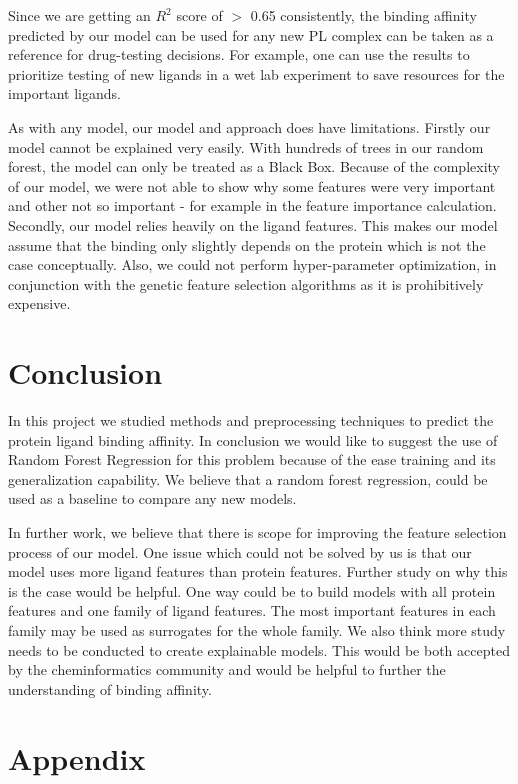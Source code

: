 \documentclass[11pt]{article}
\begin{document}
Since we are getting an $R^2$ score of $>$ 0.65 consistently,  the binding affinity predicted by our model can be used for any new PL complex can be taken as a reference for drug-testing decisions.
For example,  one can use the results to prioritize testing of new ligands in a wet lab experiment to save resources for the important ligands.

As with any model,  our model and approach does have limitations. 
Firstly our model cannot be explained very easily.
With hundreds of trees in our random forest, the model can only be treated as a Black Box.
Because of the complexity of our model,  we were not able to show why some features were very important and other not so important - for example in the feature importance calculation.
Secondly, our model relies heavily on the ligand features. 
This makes our model assume that the binding only slightly depends on the protein which is not the case conceptually.
Also, we could not perform hyper-parameter optimization,
in conjunction with the genetic feature selection algorithms as it is prohibitively expensive.

\section{Conclusion}
In this project we studied methods and preprocessing techniques to predict the protein ligand binding affinity.
In conclusion we would like to suggest the use of Random Forest Regression for this problem because of the ease training and its generalization capability.
We believe that a random forest regression,  could be used as a baseline to compare any new models.

In further work,  we believe that there is scope for improving the feature selection process of our model.
One issue which could not be solved by us is that our model uses more ligand features than protein features.
Further study on why this is the case would be helpful.
One way could be to build models with all protein features and one family of ligand features. 
The most important features in each family may be used as surrogates for the whole family.
We also think more study needs to be conducted to create explainable models.
This would be both accepted by the cheminformatics community and would be helpful to further the understanding of binding affinity.




\section{Appendix}
\end{document}
